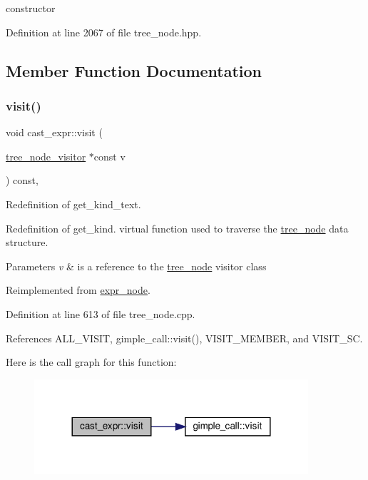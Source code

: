 constructor 



Definition at line 2067 of file tree\+\_\+node.\+hpp.



\subsection{Member Function Documentation}
\mbox{\label{structcast__expr_a6f67dad818bc71c65e92f9105faf29f6}} 
\subsubsection{\texorpdfstring{visit()}{visit()}}
{\footnotesize\ttfamily void cast\+\_\+expr\+::visit (\begin{DoxyParamCaption}\item[{\hyperlink{classtree__node__visitor}{tree\+\_\+node\+\_\+visitor} $\ast$const}]{v }\end{DoxyParamCaption}) const\hspace{0.3cm}{\ttfamily [override]}, {\ttfamily [virtual]}}



Redefinition of get\+\_\+kind\+\_\+text. 

Redefinition of get\+\_\+kind. virtual function used to traverse the \hyperlink{classtree__node}{tree\+\_\+node} data structure. 
\begin{DoxyParams}{Parameters}
{\em v} & is a reference to the \hyperlink{classtree__node}{tree\+\_\+node} visitor class \\
\hline
\end{DoxyParams}


Reimplemented from \hyperlink{structexpr__node_aac767878f13ca07371dde2c3938ef38a}{expr\+\_\+node}.



Definition at line 613 of file tree\+\_\+node.\+cpp.



References A\+L\+L\+\_\+\+V\+I\+S\+IT, gimple\+\_\+call\+::visit(), V\+I\+S\+I\+T\+\_\+\+M\+E\+M\+B\+ER, and V\+I\+S\+I\+T\+\_\+\+SC.

Here is the call graph for this function\+:
\nopagebreak
\begin{figure}[H]
\begin{center}
\leavevmode
\includegraphics[width=288pt]{d0/dfe/structcast__expr_a6f67dad818bc71c65e92f9105faf29f6_cgraph}
\end{center}
\end{figure}


